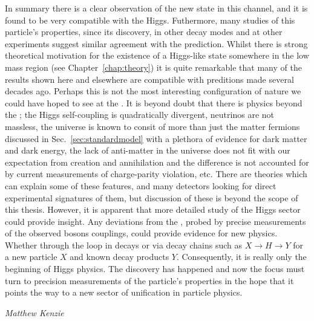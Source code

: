 In summary there is a clear observation of the new state in this channel, and it is found to be very compatible with the \SM Higgs. Futhermore, many studies of this particle's properties, since its discovery, in other decay modes and at other experiments suggest similar agreement with the \SM prediction. Whilst there is strong theoretical motivation for the existence of a Higgs-like state somewhere in the low mass region (see Chapter~\ref{chap:theory}) it is quite remarkable that many of the results shown here and elsewhere are compatible with preditions made several decades ago. Perhaps this is not the most interesting configuration of nature we could have hoped to see at the \LHC. It is beyond doubt that there is physics beyond the \SM; the Higgs self-coupling is quadratically divergent, neutrinos are not massless, the universe is known to consit of more than just the matter fermions discussed in Sec.~\ref{sec:standardmodel} with a plethora of evidence for dark matter and dark energy, the lack of anti-matter in the universe does not fit with our expectation from creation and annihilation and the difference is not accounted for by current measurements of charge-parity violation, etc. There are theories which can explain some of these features, and many detectors looking for direct experimental signatures of them, but discussion of these is beyond the scope of this thesis. However, it is apparent that more detailed study of the Higgs sector could provide insight. Any deviations from the \SM, probed by precise measurements of the observed bosons couplings, could provide evidence for new physics. Whether through the loop in \Hgg decays or via decay chains such as $X\rightarrow H\rightarrow Y$ for a new particle $X$ and known decay products $Y$. Consequently, it is really only the beginning of Higgs physics. The discovery has happened and now the focus must turn to precision measurements of the particle's properties in the hope that it points the way to a new sector of unification in particle physics.

\hfill\textit{Matthew Kenzie}
